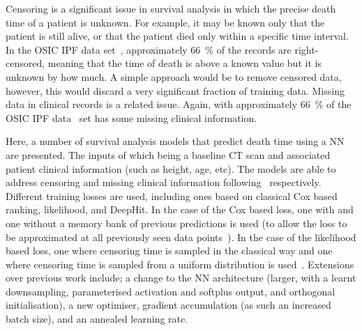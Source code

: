     Censoring is a significant issue in survival analysis in which the precise death time of a patient is unknown. For example, it may be known only that the patient is still alive, or that the patient died only within a specific time interval. In the \gls{OSIC} \gls{IPF} data set~\cite{OSICOSICRepository}, approximately \SI{66}{\percent} of the records are right-censored, meaning that the time of death is above a known value but it is unknown by how much. A simple approach would be to remove censored data, however, this would discard a very significant fraction of training data. Missing data in clinical records is a related issue. Again, with approximately \SI{66}{\percent} of the \gls{OSIC} \gls{IPF} data~\cite{OSICOSICRepository} set has some missing clinical information.

    Here, a number of survival analysis models that predict death time using a \gls{NN} are presented. The inputs of which being a baseline \gls{CT} scan and associated patient clinical information (such as height, age, etc). The models are able to address censoring and missing clinical information following~\cite{Shahin2023DeepAnalysis, Shahin2022SurvivalData} respectively. Different training losses are used, including ones based on classical Cox based ranking, likelihood, and DeepHit. In the case of the Cox based loss, one with and one without a memory bank of previous predictions is used (to allow the loss to be approximated at all previously seen data points~\cite{Shahin2022SurvivalData}). In the case of the likelihood based loss, one where censoring time is sampled in the classical way and one where censoring time is sampled from a uniform distribution is used~\cite{Shahin2023DeepAnalysis}. Extensions over previous work include; a change to the \gls{NN} architecture (larger, with a learnt downsampling, parameterised activation and softplus output, and orthogonal initialisation), a new optimiser, gradient accumulation (as such an increased batch size), and an annealed learning rate.

